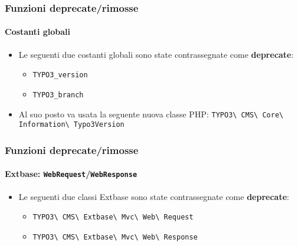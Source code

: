 \begin{frame}[fragile]
	\frametitle{Funzioni deprecate/rimosse}
	\framesubtitle{Costanti globali}

	\lstset{basicstyle=\smaller\ttfamily}

	\begin{itemize}
		\item Le seguenti due costanti globali sono state contrassegnate come \textbf{deprecate}:

			\begin{itemize}
				\item \texttt{TYPO3\_version}
				\item \texttt{TYPO3\_branch}
			\end{itemize}

		\item Al suo posto va usata la seguente nuova classe PHP:\newline
			\small
				\texttt{TYPO3\textbackslash
					CMS\textbackslash
					Core\textbackslash
					Information\textbackslash
					Typo3Version}\normalsize

	\end{itemize}

\end{frame}


\begin{frame}[fragile]
	\frametitle{Funzioni deprecate/rimosse}
	\framesubtitle{Extbase: \texttt{WebRequest}/\texttt{WebResponse}}

	\begin{itemize}
		\item Le seguenti due classi Extbase sono state contrassegnate come \textbf{deprecate}:
			\begin{itemize}
				\item \texttt{TYPO3\textbackslash
					CMS\textbackslash
					Extbase\textbackslash
					Mvc\textbackslash
					Web\textbackslash
					Request}
				\item \texttt{TYPO3\textbackslash
					CMS\textbackslash
					Extbase\textbackslash
					Mvc\textbackslash
					Web\textbackslash
					Response}
			\end{itemize}

	\end{itemize}

\end{frame}

